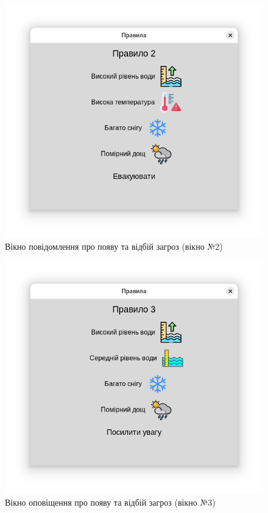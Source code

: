 \documentclass[14pt]{extreport}
\begin{document}
\begin{normalsize}
	\begin{figure}[H]
	  \centering
	  \includegraphics[scale=0.7, trim=0 50pt 0 50pt, clip]{2}
	  \caption{Вікно повідомлення про появу та відбій загроз (вікно №2)}
	\end{figure}
	
	\begin{figure}[H]
	  \centering
	  \includegraphics[scale=0.7, trim=0 50pt 0 50pt, clip]{3}
	  \caption{Вікно оповіщення про появу та відбій загроз (вікно №3)}
	\end{figure}
	

\end{normalsize}
\end{document}

